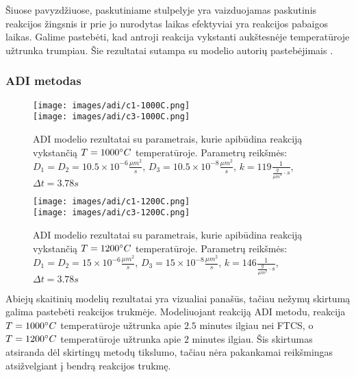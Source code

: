 Šiuose pavyzdžiuose, paskutiniame stulpelyje yra vaizduojamas paskutinis reakcijos žingsnis ir prie jo nurodytas laikas efektyviai yra reakcijos pabaigos laikas. Galime pastebėti, kad antroji reakcija vykstanti aukštesnėje temperatūroje užtrunka trumpiau. Šie rezultatai sutampa su modelio autorių pastebėjimais \cite{mackeviciusCloserLookComputer2012}.

\subsubsection{ADI metodas}

\begin{figure}[h!]
  \centering
  \texttt{[image: images/adi/c1-1000C.png]} \\ 
  \texttt{[image: images/adi/c3-1000C.png]}
  \caption{ADI modelio rezultatai su parametrais, kurie apibūdina reakciją vykstančią $T=1000\degree C$ temperatūroje. Parametrų reikšmės: $D_1 = D_2 = 10.5\times 10^{-6} \frac{\mu m^2}{s}$, $D_3 = 10.5\times 10^{-8} \frac{\mu m^2}{s}$, $k = 119 \frac{1}{ \frac{g}{\mu m^3}\cdot s}$, $\Delta t = 3.78s$}
  \label{fig:adi-result-T-1000}
\end{figure}

\begin{figure}[h!]
  \centering
  \texttt{[image: images/adi/c1-1200C.png]} \\ 
  \texttt{[image: images/adi/c3-1200C.png]}
  \caption{ADI modelio rezultatai su parametrais, kurie apibūdina reakciją vykstančią $T=1200\degree C$ temperatūroje. Parametrų reikšmės: $D_1 = D_2 = 15\times 10^{-6} \frac{\mu m^2}{s}$, $D_3 = 15\times 10^{-8} \frac{\mu m^2}{s}$, $k = 146 \frac{1}{ \frac{g}{\mu m^3}\cdot s}$, $\Delta t = 3.78s$}
  \label{fig:adi-result-T-1200}
\end{figure}

Abiejų skaitinių modelių rezultatai yra vizualiai panašūs, tačiau nežymų skirtumą galima pastebėti reakcijos trukmėje. Modeliuojant reakciją ADI metodu, reakcija $T=1000\degree C$ temperatūroje užtrunka apie $2.5$ minutes ilgiau nei FTCS, o $T=1200\degree C$ temperatūroje užtrunka apie $2$ minutes ilgiau. Šis skirtumas atsiranda dėl skirtingų metodų tikslumo, tačiau nėra pakankamai reikšmingas atsižvelgiant į bendrą reakcijos trukmę.
